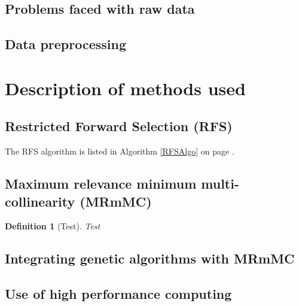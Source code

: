 \documentclass[12pt, twoside, a4paper]{article}
\newtheorem{definition}{Definition}[subsection]
\begin{document}
\subsection{Problems faced with raw data}

\subsection{Data preprocessing}

\section{Description of methods used}

\subsection{Restricted Forward Selection (RFS)} \label{body:rfs}


The RFS algorithm is listed in Algorithm \ref{RFSAlgo} on page \pageref{RFSAlgo}.



\subsection{Maximum relevance minimum multi-collinearity (MRmMC)} \label{mrmmc}


\begin{definition}[Test]
Test
\end{definition}



\subsection{Integrating genetic algorithms with MRmMC}

\subsection{Use of high performance computing}
\end{document}
